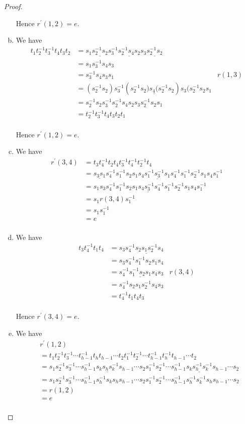 \documentclass[11pt]{amsart}
\theoremstyle{definition}
\begin{document}
\begin{proof}
\begin{enumerate}[a)]
\noindent Hence $r^\prime(1,2) = e$.

\item We have
\begin{align*}
t_1t_2^{-1}t_3^{-1}t_4t_3t_2 &= s_1\underline{s_2^{-1}s_2}s_3^{-1}\underline{s_2^{-1}s_4s_2}s_3 \underline{s_2^{-1}s_2}\\
&= s_1s_3^{-1}s_4s_3\\
&= s_3^{-1}s_4s_3s_1 &r(1,3)\\
&= (s_2^{-1}s_2)s_3^{-1}(s_2^{-1}\underline{s_2)s_4(s_2^{-1}}s_2)s_3(s_2^{-1}s_2s_1\\
&= s_2^{-1}s_2s_3^{-1}s_2^{-1}s_4s_2s_3s_2^{-1}s_2s_1\\
&= t_2^{-1}t_3^{-1}t_4t_3t_2t_1\\
\end{align*}

\noindent Hence $r^\prime(1,2) = e$.

\item We have
\begin{align*}
r^\prime(3,4) &= t_3t_4^{-1}t_2t_4t_3^{-1}t_4^{-1}t_2^{-1}t_4\\
&= \underline{s_3s_1}s_4^{-1}s_1^{-1}s_2s_1s_4\underline{s_1^{-1}s_3^{-1}s_1}s_4^{-1}s_1^{-1}s_2^{-1}s_1s_4s_1^{-1}\\
&= s_1\underline{s_3s_4^{-1}s_1^{-1}s_2s_1s_4s_3^{-1}s_4^{-1}s_1^{-1}s_2^{-1}s_1s_4}s_1^{-1}\\
&= s_1r(3,4)s_1^{-1}\\
&= s_1s_1^{-1}\\
&= e\\
\end{align*}

\item We have
\begin{align*}
t_3t_4^{-1}t_1t_4 &= s_3s_4^{-1}\underline{s_2s_1s_2^{-1}}s_4\\
&= s_3s_4^{-1}s_1^{-1}s_2s_1s_4\\
&= s_4^{-1}\underline{s_1^{-1}s_2s_1}s_4s_3 &r(3,4)\\
&= s_4^{-1}s_2s_1s_2^{-1}s_4s_3\\
&= t_4^{-1}t_1t_4t_3\\
\end{align*}

\noindent Hence $r^\prime(3,4) = e$.

\item We have
\begin{align*}
&r^\prime(1,2)\\
&= t_1t_2^{-1}t_3^{-1}\cdots t_{h-1}^{-1}t_ht_{h-1}\cdots t_2t_1^{-1}t_2^{-1}\cdots t_{h-1}^{-1}t_h^{-1}t_{h-1}\cdots t_2\\
&= s_1s_2^{-1}s_3^{-1}\cdots s_{h-1}^{-1}\underline{s_ks_hs_k^{-1}}s_{h-1}\cdots s_2s_1^{-1}s_2^{-1}\cdots s_{h-1}^{-1}\underline{s_ks_h^{-1}s_k^{-1}}s_{h-1}\cdots s_2\\
&= s_1s_2^{-1}s_3^{-1}\cdots s_{h-1}^{-1}s_h^{-1}s_ks_hs_{h-1}\cdots s_2s_1^{-1}s_2^{-1}\cdots s_{h-1}^{-1}s_h^{-1}s_k^{-1}s_hs_{h-1}\cdots s_2\\
&= r(1,2)\\
&= e\\
\end{align*}


\end{enumerate}
\end{proof}
\end{document}
